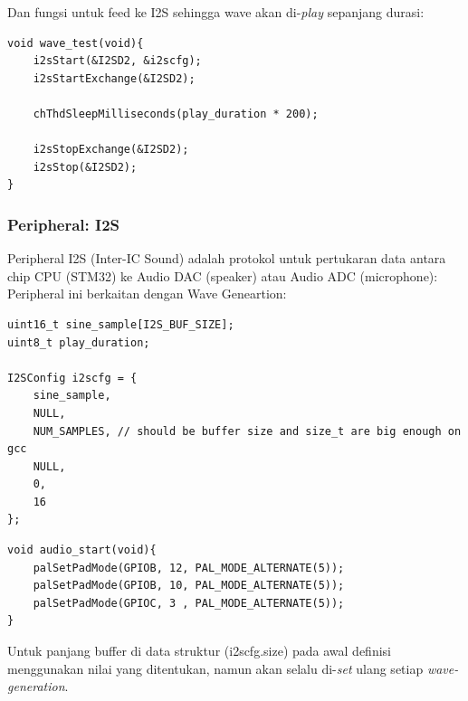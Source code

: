 \documentclass[12pt,]{article}
\begin{document}
	Dan fungsi untuk feed ke I2S sehingga wave akan di-\textit{play} sepanjang durasi:
	\begin{verbatim}
void wave_test(void){
	i2sStart(&I2SD2, &i2scfg);
	i2sStartExchange(&I2SD2);
	
	chThdSleepMilliseconds(play_duration * 200);
	
	i2sStopExchange(&I2SD2);
	i2sStop(&I2SD2);
}
	\end{verbatim}
	
	\subsubsection{Peripheral: I2S}
	
	Peripheral I2S (Inter-IC Sound) adalah protokol untuk pertukaran data antara chip CPU (STM32) ke Audio DAC (speaker) atau Audio ADC (microphone):
	Peripheral ini berkaitan dengan Wave Geneartion:
	\begin{verbatim}
uint16_t sine_sample[I2S_BUF_SIZE];
uint8_t play_duration;

I2SConfig i2scfg = {
	sine_sample,
	NULL,
	NUM_SAMPLES, // should be buffer size and size_t are big enough on gcc
	NULL,
	0,
	16
};
	\end{verbatim}
	\newpage
	\begin{verbatim}
void audio_start(void){
	palSetPadMode(GPIOB, 12, PAL_MODE_ALTERNATE(5));
	palSetPadMode(GPIOB, 10, PAL_MODE_ALTERNATE(5));
	palSetPadMode(GPIOC, 3 , PAL_MODE_ALTERNATE(5));
}
	\end{verbatim}
	Untuk panjang buffer di data struktur (i2scfg.size) pada awal definisi menggunakan nilai yang ditentukan,
	namun akan selalu di-\textit{set} ulang setiap \textit{wave-generation}.
	
\end{document}
